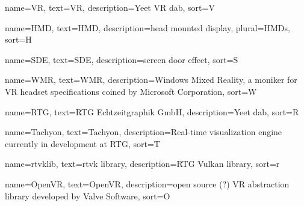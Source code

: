 
{
  name=VR,
  text=VR,
  description={Yeet VR dab}, 
  sort=V
}

{
  name=HMD,
  text=HMD,
  description={head mounted display}, 
  plural=HMDs, 
  sort=H
}

{
  name=SDE,
  text=SDE,
  description={screen door effect}, 
  sort=S
}

{
  name=WMR,
  text=WMR,
  description={Windows Mixed Reality, a moniker for \gls{VR} headset specifications coined by Microsoft Corporation}, 
  sort=W
}

{
  name=RTG,
  text=RTG Echtzeitgraphik GmbH,
  description={Yeet dab}, 
  sort=R
}

{
  name=Tachyon,
  text=Tachyon,
  description={Real-time visualization engine currently in development at \gls{RTG}}, 
  sort=T
}

{
  name=rtvklib,
  text=rtvk library,
  description={\gls{RTG} Vulkan library}, 
  sort=r
}

{
  name=OpenVR,
  text=OpenVR,
  description={open source (?) \gls{VR} abstraction library developed by Valve Software}, 
  sort=O
}









\iffalse
\newacronym[shortplural={D$_{\text{dye}}$}, longplural={donor dye, ex. Alexa 488}]{ddye}{D$_{\text{dye}}$}{donor dye, ex. Alexa 488}

\newacronym[description={\glslink{r0}{F\"{o}rster distance}}]{R0}{$R_{0}$}{F\"{o}rster distance}

\newglossaryentry{r0}
{
  name=\glslink{R0}{\ensuremath{R_{0}}},
  text=F\"{o}rster distance,
  description={F\"{o}rster distance, where 50\% ...}, 
  sort=R
}

\newglossaryentry{kdeac}
{
  name=\glslink{R0}{\ensuremath{k_{DEAC}}},
  text=$k_{DEAC}$, 
  description={is the rate of deactivation from ... and emission)}, 
  sort=k
}

\newacronym[shortplural={TUM}, longplural={Technical University of Munich}]{tuma}{TUM}
{Technical University of Munich}

\newglossaryentry{tum}
{
  name = TUM,
  description = {A university in Germany, Bavaria, in the city of Munich},
  plural = TUM
}

\newglossaryentry{computer}
{
  name=computer,
  description={is a programmable machine that receives input,
               stores and manipulates data, and provides
               output in a useful format}
}
\fi